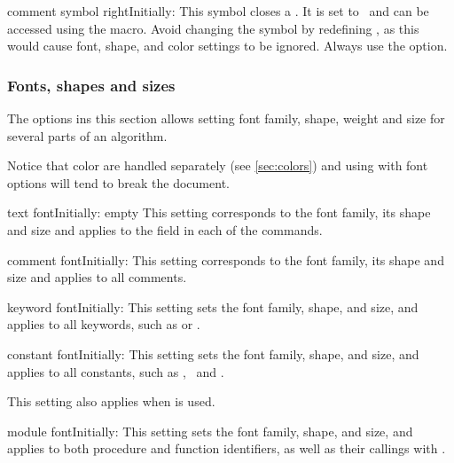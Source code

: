 \documentclass[a4paper, 11pt]{article}
\begin{document}
\begin{Optiondef}{comment symbol right}{}{Initially: \PDInline{$\triangleleft$}}
    This symbol closes a . It is set to \CommentSymbolRight\ and can be accessed using the  macro. Avoid changing the symbol by redefining , as this would cause font, shape, and color settings to be ignored. Always use the  option.
\end{Optiondef}

\subsubsection{Fonts, shapes and sizes}
The options ins this section allows setting font family, shape, weight and size for several parts of an algorithm.

Notice that color are handled separately (see \cref{sec:colors}) and using  with font options will tend to break the document.

\begin{Optiondef}{text font}{}{Initially: empty}
    This setting corresponds to the font family, its shape and size and applies to the  field in each of the commands.
\end{Optiondef}
%
\begin{Optiondef}{comment font}{}{Initially: \PDInline{\slshape}}
    This setting corresponds to the font family, its shape and size and applies to all comments.
\end{Optiondef}

\begin{Optiondef}{keyword font}{}{Initially: \PDInline{\bfseries}}
    This setting sets the font family, shape, and size, and applies to all keywords, such as  or .
\end{Optiondef}

\begin{Optiondef}{constant font}{}{Initially: \PDInline{\scshape}}
    This setting sets the font family, shape, and size, and applies to all constants, such as \Nil, \True\ and \False.

    This setting also applies when  is used.
\end{Optiondef}

\begin{Optiondef}{module font}{}{Initially: \PDInline{\scshape}}
    This setting sets the font family, shape, and size, and applies to both procedure and function identifiers, as well as their callings with .
\end{Optiondef}
\end{document}
